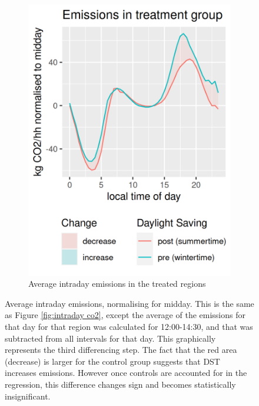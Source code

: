 \begin{figure}[ht]
\begin{subfigure}[t]{0.45\textwidth}
        \includegraphics[width=\textwidth]{Images/intraday/co2_g_per_capita_vs_midday/by-treated/treatment/hr_local-filled.png}
        \caption{Average intraday emissions in the treated regions} %
        \label{fig:intraday co2 treated midday}
    \end{subfigure}
    \caption[Average intraday emissions, normalising for midday]{Average intraday emissions, normalising for midday. This is the same as Figure \ref{fig:intraday co2}, except the average of the emissions for that day for that region was calculated for 12:00-14:30, and that was subtracted from all intervals for that day. This graphically represents the third differencing step. The fact that the red area (decrease) is larger for the control group suggests that \acs{DST} increases emissions. However once controls are accounted for in the regression, this difference changes sign and becomes statistically insignificant.} 
    \label{fig:intraday co2 midday}
\end{figure}











\FloatBarrier







